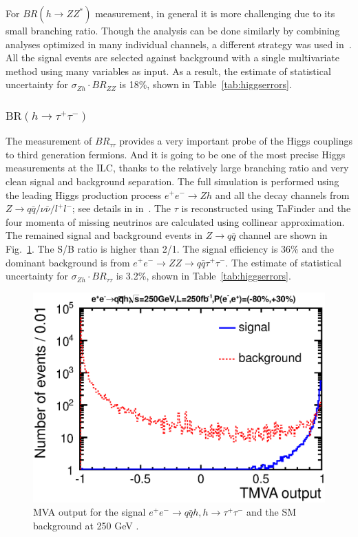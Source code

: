 For $BR(h\to ZZ^*)$ measurement, in general it is more challenging due to its small branching ratio.
Though the analysis can be done similarly by combining analyses optimized in many individual channels, 
a different strategy was used in~\cite{Asner:2013psa}.
All the signal events are selected against background with a single multivariate method using many
variables as input. As a result, the estimate of statistical uncertainty for
$\sigma_{Zh}\cdot BR_{ZZ}$ is 18\%, shown in Table~\ref{tab:higgserrors}.


\subsubsection{$\mathrm{BR}(h\to \tau^+\tau^-)$}
The measurement of $BR_{\tau\tau}$ provides a very important probe of the Higgs couplings to
third generation fermions. And it is going to be one of the most precise Higgs measurements at the ILC, 
thanks to the relatively large branching ratio and very clean signal and background separation. 
The full simulation is performed using the leading Higgs production process $e^+e^-\to Zh$ and 
all the decay channels from $Z\to q\bar{q} / \nu\bar{\nu}/ l^+l^-$; see details in in~\cite{Kawada:2015wea}.
The $\tau$ is reconstructed using TaFinder and the four momenta of missing neutrinos are 
calculated using collinear approximation. The remained signal and
 background events in $Z\to q\bar{q}$ channel are shown in 
 Fig.~\ref{fig:qqHtautau250}. The S/B ratio is higher than 2/1. The signal efficiency is 36\% and
 the dominant background is from $e^+e^-\to ZZ\to q\bar{q}\tau^+\tau^-$.
 The estimate of statistical uncertainty for $\sigma_{Zh}\cdot BR_{\tau\tau}$ is 
3.2\%, shown in Table~\ref{tab:higgserrors}.

\begin{figure}
\begin{center}
\includegraphics[width=0.85\hsize]{chapters/figures/ZH_qqtautau250_TMVA.eps}
\end{center}
  \caption{MVA output for the signal $e^+e^-\to q\bar{q} h, h\to\tau^+\tau^-$
 and the SM background at 250 GeV \cite{Kawada:2015wea}.}
  \label{fig:qqHtautau250}
\end{figure}

